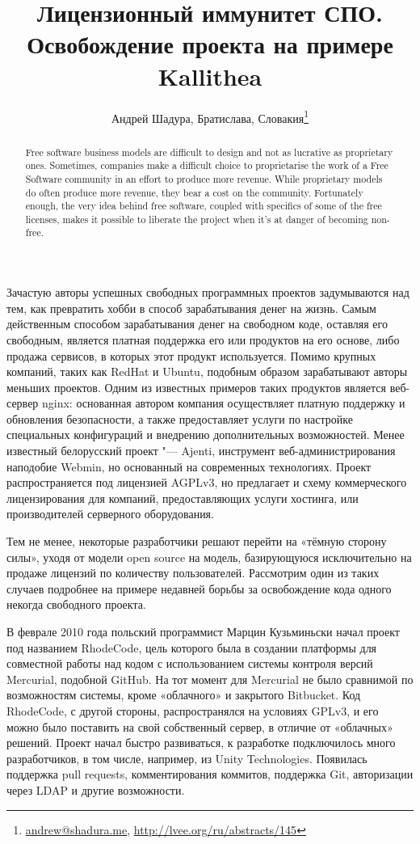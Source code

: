 \documentclass[10pt, a5paper]{article}
\begin{document}
\title{Лицензионный иммунитет СПО. Освобождение проекта на примере Kallithea}
\author{Андрей Шадура, Братислава, Словакия\footnote{\url{andrew@shadura.me}, \url{http://lvee.org/ru/abstracts/145}}}
\maketitle
\begin{abstract}
Free software business models are difficult to design and not as lucrative as proprietary ones. Sometimes, companies make a difficult                choice to proprietarise the work of a Free Software community in an effort to produce more revenue. While proprietary models do often produce more revenue, they bear a cost on the community. Fortunately enough, the very idea behind free software, coupled with specifics of some of the free licenses, makes it possible to liberate the project when it's at danger of becoming non-free.
\end{abstract}
Зачастую авторы успешных свободных программных проектов задумываются над тем, как превратить хобби в способ зарабатывания денег на жизнь. Самым действенным способом зарабатывания денег на свободном коде, оставляя его свободным, является платная поддержка его или продуктов на его основе, либо продажа сервисов, в которых этот продукт используется. Помимо крупных компаний, таких как RedHat и Ubuntu, подобным образом зарабатывают авторы меньших проектов. Одним из известных примеров таких продуктов является веб-сервер nginx: основанная автором компания осуществляет платную поддержку и обновления безопасности, а также предоставляет услуги по настройке специальных конфигураций и внедрению дополнительных возможностей. Менее известный белорусский проект "--- Ajenti, инструмент веб-администрирования наподобие Webmin, но основанный на современных технологиях. Проект распространяется под лицензией AGPLv3, но предлагает и схему коммерческого лицензирования для компаний, предоставляющих услуги хостинга, или производителей серверного оборудования.

Тем не менее, некоторые разработчики решают перейти на «тёмную сторону силы», уходя от модели open source на модель, базирующуюся исключительно на продаже лицензий по количеству пользователей. Рассмотрим один из таких случаев подробнее на примере недавней борьбы за освобождение кода одного некогда свободного проекта.

В феврале 2010 года польский программист Марцин Кузьминьски начал проект под названием RhodeCode, цель которого была в создании платформы для совместной работы над кодом с использованием системы контроля версий Mercurial, подобной GitHub. На тот момент для Mercurial не было сравнимой по возможностям системы, кроме «облачного» и закрытого Bitbucket. Код RhodeCode, с другой стороны, распространялся на условиях GPLv3, и его можно было поставить на свой собственный сервер, в отличие от «облачных» решений. Проект начал быстро развиваться, к разработке подключилось много разработчиков, в том числе, например, из Unity Technologies. Появилась поддержка pull requests, комментирования коммитов, поддержка Git, авторизации через LDAP и другие возможности.
\end{document}
